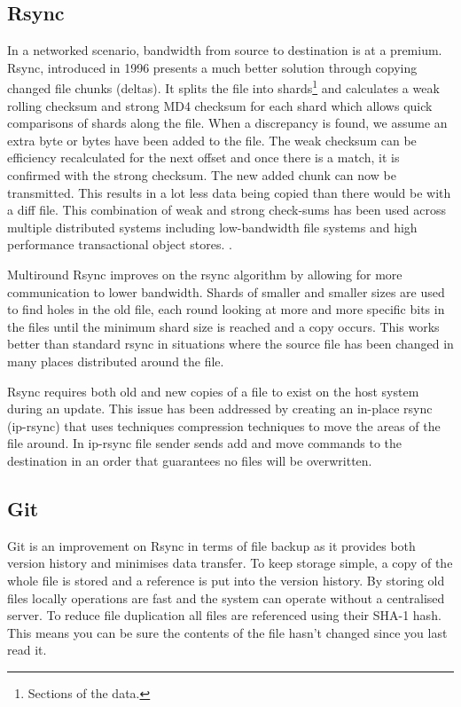 \documentclass[11pt, a4paper, twoside]{report}
\begin{document}
\subsection{Rsync}
In a networked scenario, bandwidth from source to destination is at a premium. Rsync, introduced in 1996 presents a much better solution through copying changed file chunks (deltas). \citep{tridgell1996rsync} It splits the file into shards\footnote{Sections of the data.} and calculates a weak rolling checksum and strong MD4 checksum for each shard which allows quick comparisons of shards along the file. When a discrepancy is found, we assume an extra byte or bytes have been added to the file. The weak checksum can be efficiency recalculated for the next offset and once there is a match, it is confirmed with the strong checksum. The new added chunk can now be transmitted. This results in a lot less data being copied than there would be with a diff file. \citep{tridgell1996rsync} This combination of weak and strong check-sums has been used across multiple distributed systems including low-bandwidth file systems \citep{muthitacharoen2001low} and high performance transactional object stores. \citep{stephen2000platypus}.

Multiround Rsync improves on the rsync algorithm by allowing for more communication to lower bandwidth. Shards of smaller and smaller sizes are used to find holes in the old file, each round looking at more and more specific bits in the files until the minimum shard size is reached and a copy occurs. \citep{multiroundrsync} This works better than standard rsync in situations where the source file has been changed in many places distributed around the file.

Rsync requires both old and new copies of a file to exist on the host system during an update. This issue has been addressed by creating an in-place rsync (ip-rsync) that uses techniques compression techniques to move the areas of the file around. In ip-rsync file sender sends add and move commands to the destination in an order that guarantees no files will be overwritten. \citep{rasch2003place}

\subsection{Git}

Git is an improvement on Rsync in terms of file backup as it provides both version history and minimises data transfer. To keep storage simple, a copy of the whole file is stored and a reference is put into the version history. By storing old files locally operations are fast and the system can operate without a centralised server. To reduce file duplication all files are referenced using their SHA-1 hash. This means you can be sure the contents of the file hasn’t changed since you last read it. \citep{torvalds2010git}
\end{document}
